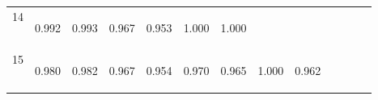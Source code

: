 \begin{center}
\begin{tabular}{lcccccccccccc}
14 & \begin{bf}0.992\end{bf} & \begin{rm}0.993\end{rm} & \begin{bf}0.967\end{bf} & \begin{rm}0.953\end{rm} & \begin{bf}1.000\end{bf} & \begin{rm}1.000\end{rm} & \begin{bf}\end{bf} & \begin{rm}\end{rm} & \begin{bf}\end{bf} & \begin{rm}\end{rm} & \begin{bf}\end{bf} & \begin{rm}\end{rm}\\
15 & \begin{bf}0.980\end{bf} & \begin{rm}0.982\end{rm} & \begin{bf}0.967\end{bf} & \begin{rm}0.954\end{rm} & \begin{bf}0.970\end{bf} & \begin{rm}0.965\end{rm} & \begin{bf}1.000\end{bf} & \begin{rm}0.962\end{rm} & \begin{bf}\end{bf} & \begin{rm}\end{rm} & \begin{bf}\end{bf} & \begin{rm}\end{rm}\\

\end{tabular}
\end{center}
